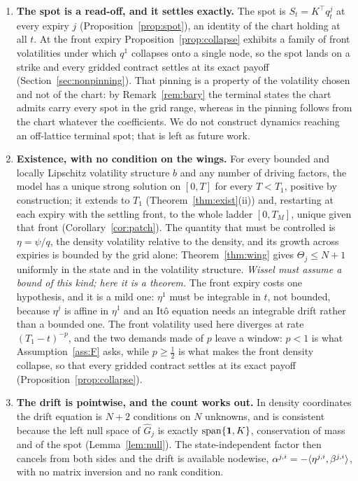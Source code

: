 \begin{enumerate}[leftmargin=1.8em,itemsep=0.45em]
\item \textbf{The spot is a read-off, and it settles exactly.}
The spot is $S_t=K^{\!\top}q^j_t$ at every expiry $j$ (Proposition~\ref{prop:spot}),
an identity of the chart holding at all $t$. At the front
expiry Proposition~\ref{prop:collapse} exhibits a family of front volatilities
under which $q^1$ collapses onto a single node, so the spot lands on a strike
and every gridded contract settles at its exact payoff
(Section~\ref{sec:nonpinning}). That pinning is a property of the volatility
chosen and not of the chart: by Remark~\ref{rem:bary} the terminal states
the chart admits carry every spot in the grid range, whereas in
\cite{Wissel2007} the pinning follows from the chart whatever the coefficients.
We do not construct dynamics reaching an off-lattice
terminal spot; that is left as future work.

\item \textbf{Existence, with no condition on the wings.} For every bounded and
locally Lipschitz volatility structure $b$ and any number of driving factors, the
model has a unique strong solution on $[0,T]$ for every $T<T_1$, positive by
construction; it extends to $T_1$ (Theorem~\ref{thm:exist}(ii)) and, restarting at each
expiry with the settling front, to the whole ladder $[0,T_M]$, unique given that
front (Corollary~\ref{cor:patch}). The quantity that must be controlled is
$\eta=\psi/q$, the density volatility relative to the density, and its growth across
expiries is bounded by the grid alone: Theorem~\ref{thm:wing} gives $\Theta_j\le N+1$
uniformly in the state and in the volatility structure. \emph{Wissel \cite{Wissel2007} must assume a bound of this
kind; here it is a theorem.} The front expiry costs one hypothesis, and it is a mild one: $\eta^1$
must be integrable in $t$, not bounded, because $\eta^j$ is affine in $\eta^1$
and an It\^o equation needs an integrable drift rather than a bounded one. The
front volatility used here diverges at rate $(T_1-t)^{-p}$, and the two demands
made of $p$ leave a window: $p<1$ is what Assumption~\ref{ass:F} asks, while
$p\ge\tfrac12$ is what makes the front density collapse, so that every gridded
contract settles at its exact payoff (Proposition~\ref{prop:collapse}).

\item \textbf{The drift is pointwise, and the count works out.} In density
coordinates the drift equation is $N+2$ conditions on $N$ unknowns, and is
consistent because the left null space of $\widehat G_j$ is exactly
$\mathrm{span}\{\mathbf 1,K\}$, conservation of mass and of the spot
(Lemma~\ref{lem:null}). The state-independent factor then cancels from both
sides and the drift is available nodewise,
$\alpha^{j,i}=-\langle \eta^{j,i},\beta^{j,i}\rangle$, with no matrix inversion and no
rank condition.
\end{enumerate}

